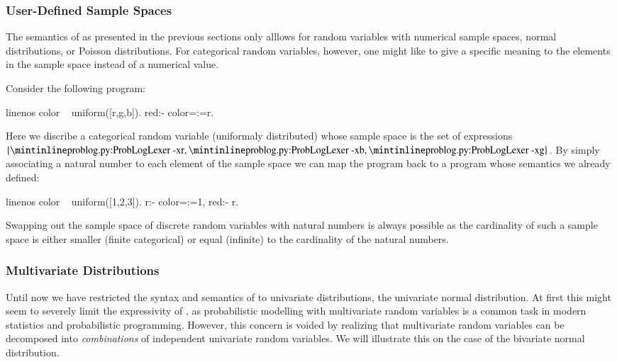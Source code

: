 \subsubsection{User-Defined Sample Spaces}
The semantics of \dcproblogsty as presented in the previous sections only alllows for random variables with numerical sample spaces, \eg normal distributions, or Poisson distributions. For categorical random variables, however, one might like to give a specific meaning to the elements in the sample space instead of a numerical value.
\begin{example}
	Consider the following program:
	\begin{problog*}{linenos}
color ~ uniform([r,g,b]).
red:- color=:=r.
	\end{problog*}
	Here we discribe a categorical random variable (uniformaly distributed) whose sample space is the set of expressions $\{\text{\probloginline{r}},\text{\probloginline{b}},\text{\probloginline{g}}\}$. By simply associating a natural number to each element of the sample space we can map the program back to a program whose semantics we already defined:
	\begin{problog*}{linenos}
color ~ uniform([1,2,3]).
r:- color=:=1,
red:- r.
	\end{problog*}
\end{example}

Swapping out the sample space of discrete random variables with natural numbers is always possible as the cardinality of such a sample space is either smaller (finite categorical) or equal (infinite) to the cardinality of the natural numbers.

\subsubsection{Multivariate Distributions}

Until now we have restricted the syntax and semantics of \dcproblogsty to univariate distributions, \eg the univariate normal distribution. At first this might seem to severely limit the expressivity of \dcproblogsty, as probabilistic modelling with multivariate random variables is a common task in modern statistics and probabilistic programming. However, this concern is voided by realizing that multivariate random variables can be decomposed into {\em combinations} of independent univariate random variables. We will illustrate this on the case of the bivariate normal distribution.


